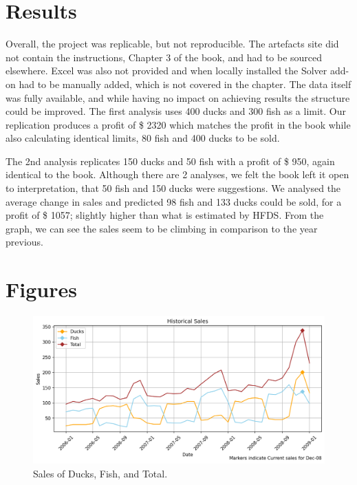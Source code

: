 \documentclass[acmtog]{acmart}
\begin{document}
\section{Results}
Overall, the project was replicable, but not reproducible. The artefacts site did not contain the instructions, Chapter 3 of the book, and had to be sourced elsewhere. Excel was also not provided and when locally installed the Solver add-on had to be manually added, which is not covered in the chapter. The data itself was fully available, and while having no impact on achieving results the structure could be improved. The first analysis uses 400 ducks and 300 fish as a limit. Our replication produces a profit of \$ 2320 which matches the profit in the book while also calculating identical limits, 80 fish and 400 ducks to be sold. 

The 2nd analysis replicates 150 ducks and 50 fish with a profit of \$ 950, again identical to the book. Although there are 2 analyses, we felt the book left it open to interpretation, that 50 fish and 150 ducks were suggestions. We analysed the average change in sales and predicted 98 fish and 133 ducks could be sold, for a profit of \$ 1057; slightly higher than what is estimated by HFDS. From the graph, we can see the sales seem to be climbing in comparison to the year previous.

\section{Figures}
\begin{figure}[h!]
  \includegraphics[width=\linewidth]{historic_sales.jpg}
  \caption{Sales of Ducks, Fish, and Total.}
  \label{fig:boat1}
\end{figure}
\end{document}
